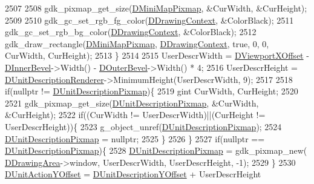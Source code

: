 \begin{DoxyCode}
{2507         
2508         gdk\_pixmap\_get\_size(\hyperlink{classCApplicationData_abe3af81659ead5113b7b2f165a88e737}{DMiniMapPixmap}, &CurWidth, &CurHeight);
2509 
2510         gdk\_gc\_set\_rgb\_fg\_color(\hyperlink{classCApplicationData_aa6c5bea9bdcc64398e5a3f693661d37c}{DDrawingContext}, &ColorBlack);
2511         gdk\_gc\_set\_rgb\_bg\_color(\hyperlink{classCApplicationData_aa6c5bea9bdcc64398e5a3f693661d37c}{DDrawingContext}, &ColorBlack);
2512         gdk\_draw\_rectangle(\hyperlink{classCApplicationData_abe3af81659ead5113b7b2f165a88e737}{DMiniMapPixmap}, \hyperlink{classCApplicationData_aa6c5bea9bdcc64398e5a3f693661d37c}{DDrawingContext}, \textcolor{keyword}{true}, 0, 0, 
      CurWidth, CurHeight);
2513     \}
2514     
2515     UserDescrWidth = \hyperlink{classCApplicationData_a306bba873ccc47126111305fe21ef3ff}{DViewportXOffset} - \hyperlink{classCApplicationData_a29a687c44dceb9e87a56d96612d59ab5}{DInnerBevel}->Width() - 
      \hyperlink{classCApplicationData_abc2b04aa05148da81145ff6d6bc2bf01}{DOuterBevel}->Width() * 4;
2516     UserDescrHeight = \hyperlink{classCApplicationData_a194301f34566fc497b032bdfcad55287}{DUnitDescriptionRenderer}->MinimumHeight(UserDescrWidth, 9);
2517     
2518     \textcolor{keywordflow}{if}(\textcolor{keyword}{nullptr} != \hyperlink{classCApplicationData_a52e5c1a2ac452c82580ba3f4978c3501}{DUnitDescriptionPixmap})\{
2519         gint CurWidth, CurHeight;
2520         
2521         gdk\_pixmap\_get\_size(\hyperlink{classCApplicationData_a52e5c1a2ac452c82580ba3f4978c3501}{DUnitDescriptionPixmap}, &CurWidth, &CurHeight);
2522         \textcolor{keywordflow}{if}((CurWidth != UserDescrWidth)||(CurHeight != UserDescrHeight))\{
2523             g\_object\_unref(\hyperlink{classCApplicationData_a52e5c1a2ac452c82580ba3f4978c3501}{DUnitDescriptionPixmap});
2524             \hyperlink{classCApplicationData_a52e5c1a2ac452c82580ba3f4978c3501}{DUnitDescriptionPixmap} = \textcolor{keyword}{nullptr};
2525         \}
2526     \}
2527     \textcolor{keywordflow}{if}(\textcolor{keyword}{nullptr} == \hyperlink{classCApplicationData_a52e5c1a2ac452c82580ba3f4978c3501}{DUnitDescriptionPixmap})\{
2528         \hyperlink{classCApplicationData_a52e5c1a2ac452c82580ba3f4978c3501}{DUnitDescriptionPixmap} = gdk\_pixmap\_new(
      \hyperlink{classCApplicationData_a4735f5d31632313e0b2a1659eb178987}{DDrawingArea}->window, UserDescrWidth, UserDescrHeight, -1);
2529     \}
2530     \hyperlink{classCApplicationData_a8ccfb55bd25cba0e6eb66573ba9c8b3c}{DUnitActionYOffset} = \hyperlink{classCApplicationData_a6c60b2da482699f1d998acfe24fec332}{DUnitDescriptionYOffset} + UserDescrHeight
}
\end{DoxyCode}
